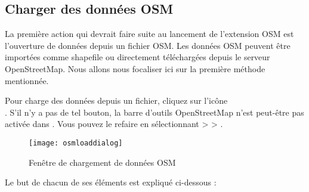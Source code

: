 \subsection{Charger des données OSM}

La première action qui devrait faire suite au lancement de l'extension OSM est l'ouverture de données depuis un fichier OSM. Les données OSM peuvent être importées comme shapefile ou directement téléchargées depuis le serveur OpenStreetMap. Nous allons nous focaliser ici sur la première méthode mentionnée.

Pour charge des données depuis un fichier, cliquez sur l'icône\\ . S'il n'y a pas de tel bouton, la barre d'outils OpenStreetMap n'est peut-être pas activée dans \qg. Vous pouvez le refaire en sélectionnant  >  > .

\begin{figure}[ht]
\centering
   \texttt{[image: osmloaddialog]}
   \caption{Fenêtre de chargement de données OSM \nixcaption}\label{fig:osmload}
\end{figure}

Le but de chacun de ses éléments est expliqué ci-dessous :

